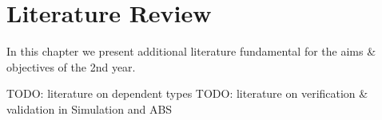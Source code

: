 \chapter{Literature Review}
\label{chap:literature}

In this chapter we present additional literature fundamental for the aims \& objectives of the 2nd year.

TODO: literature on dependent types
TODO: literature on verification \& validation in Simulation and ABS
